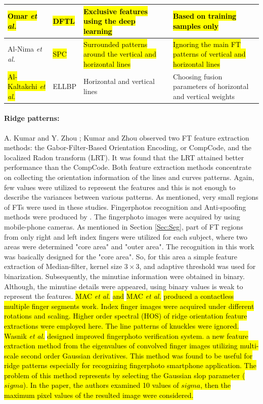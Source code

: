 \documentclass[review]{elsarticle}
\begin{document}
\begin{table}[!h]
{\begin{tabular}{|C{3.5cm}|C{3cm}|C{4cm}|C{4.5cm}|}
			\hl{Omar \textit{et al.}} \cite{omar2018deep} & \hl{DFTL} & \hl{Exclusive features using the deep learning} & \hl{Based on training samples only} \\ \hline
			Al-Nima \textit{et al.} \cite{al2018personal} & \hl{SPC} & \hl{Surrounded patterns around the vertical and horizontal lines} & \hl{Ignoring the main FT patterns of vertical and horizontal lines} \\ \hline
			\hl{Al-Kaltakchi \textit{et al.}} \cite{al2018finger} & ELLBP & Horizontal and vertical lines & Choosing fusion parameters of horizontal and vertical weights \\ \hline
		\end{tabular}}
	\end{table}
	\paragraph{\textbf{Ridge patterns:}} A. Kumar and Y. Zhou \cite{kumar2011contactless}; Kumar and Zhou \cite{Kumar2012Human} observed two FT feature extraction methods: the Gabor-Filter-Based Orientation Encoding, or CompCode, and the localized Radon transform (LRT). It was found that the LRT attained better performance than the CompCode. Both feature extraction methods concentrate on collecting the orientation information of the lines and curves patterns. Again, few values were utilized to represent the features and this is not enough to describe the variances between various patterns. As mentioned, very small regions of FTs were used in these studies. Fingerphotos recognition and Anti-spoofing methods were produced by \cite{stein2013video}. The fingerphoto images were acquired by using mobile-phone cameras. As mentioned in Section \ref{Sec:Seg}, part of FT regions from only right and left index fingers were utilized for each subject, where two areas were determined "core area" and "outer area". The recognition in this work was basically designed for the "core area". So, for this area a simple feature extraction of Median-filter, kernel size $3 \times 3$, and adaptive threshold was used for binarization. Subsequently, the minutiae information were obtained in binary. Although, the minutiae details were appeared, using binary values is weak to represent the features. \hl{MAC \textit{et al.}} \cite{MAC2018contactless} \hl{and} \hl{MAC \textit{et al.}} \cite{Jahan2018Contactless} \hl{produced a contactless multiple finger segments work. Index finger images were acquired under different rotations and scaling. Higher order spectral (HOS) of ridge orientation feature extractions were employed here. The line patterns of knuckles were ignored.} \hl{Wasnik \textit{et al.}} \cite{Wasnik2018Improved} \hl{designed improved fingerphoto verification system. a new feature extraction method from the eigenvalues of convolved finger images utilizing multi-scale second order Gaussian derivatives. This method was found to be useful for ridge patterns especially for recognizing fingerphoto smartphone application. The problem of this method represents by selecting the Gaussian slop parameter ($sigma$). In the paper, the authors examined 10 values of $sigma$, then the maximum pixel values of the resulted image were considered.} 
\end{document}
